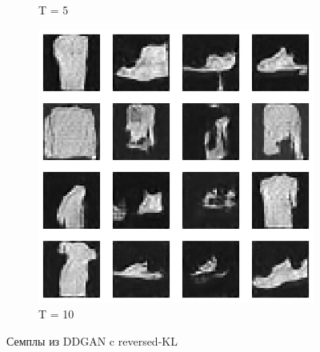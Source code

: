 \documentclass{article}
\begin{document}
\begin{figure}[H]
\begin{subfigure}[h]{0.3\linewidth}
		\caption{T = 5}
	\end{subfigure}
	\hfill
	\begin{subfigure}[h]{0.3\linewidth}
		\centering
		\includegraphics[scale=0.3]{../code/generated_DDGAN_rkl_10.png}
		\caption{T = 10}
	\end{subfigure}
	\caption{Семплы из DDGAN c reversed-KL}\label{ddgan_rkl_samples}	
\end{figure}
\end{document}
